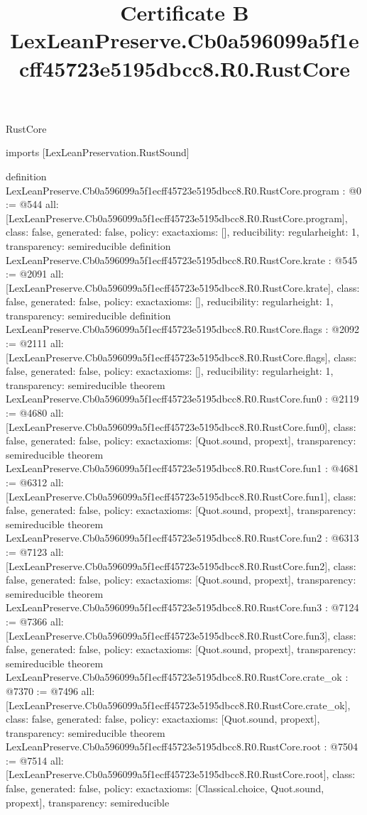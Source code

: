 \begin{lexlean}{RustCore}
\title{Certificate B LexLeanPreserve.Cb0a596099a5f1ecff45723e5195dbcc8.R0.RustCore}
\begin{coremodule}
imports [LexLeanPreservation.RustSound]

definition LexLeanPreserve.Cb0a596099a5f1ecff45723e5195dbcc8.R0.RustCore.program : @0 := @544 {
  all: [LexLeanPreserve.Cb0a596099a5f1ecff45723e5195dbcc8.R0.RustCore.program],
  class: false,
  generated: false,
  policy: exact{axioms: []},
  reducibility: regular{height: 1},
  transparency: semireducible
}
definition LexLeanPreserve.Cb0a596099a5f1ecff45723e5195dbcc8.R0.RustCore.krate : @545 := @2091 {
  all: [LexLeanPreserve.Cb0a596099a5f1ecff45723e5195dbcc8.R0.RustCore.krate],
  class: false,
  generated: false,
  policy: exact{axioms: []},
  reducibility: regular{height: 1},
  transparency: semireducible
}
definition LexLeanPreserve.Cb0a596099a5f1ecff45723e5195dbcc8.R0.RustCore.flags : @2092 := @2111 {
  all: [LexLeanPreserve.Cb0a596099a5f1ecff45723e5195dbcc8.R0.RustCore.flags],
  class: false,
  generated: false,
  policy: exact{axioms: []},
  reducibility: regular{height: 1},
  transparency: semireducible
}
theorem LexLeanPreserve.Cb0a596099a5f1ecff45723e5195dbcc8.R0.RustCore.fun0 : @2119 := @4680 {
  all: [LexLeanPreserve.Cb0a596099a5f1ecff45723e5195dbcc8.R0.RustCore.fun0],
  class: false,
  generated: false,
  policy: exact{axioms: [Quot.sound, propext]},
  transparency: semireducible
}
theorem LexLeanPreserve.Cb0a596099a5f1ecff45723e5195dbcc8.R0.RustCore.fun1 : @4681 := @6312 {
  all: [LexLeanPreserve.Cb0a596099a5f1ecff45723e5195dbcc8.R0.RustCore.fun1],
  class: false,
  generated: false,
  policy: exact{axioms: [Quot.sound, propext]},
  transparency: semireducible
}
theorem LexLeanPreserve.Cb0a596099a5f1ecff45723e5195dbcc8.R0.RustCore.fun2 : @6313 := @7123 {
  all: [LexLeanPreserve.Cb0a596099a5f1ecff45723e5195dbcc8.R0.RustCore.fun2],
  class: false,
  generated: false,
  policy: exact{axioms: [Quot.sound, propext]},
  transparency: semireducible
}
theorem LexLeanPreserve.Cb0a596099a5f1ecff45723e5195dbcc8.R0.RustCore.fun3 : @7124 := @7366 {
  all: [LexLeanPreserve.Cb0a596099a5f1ecff45723e5195dbcc8.R0.RustCore.fun3],
  class: false,
  generated: false,
  policy: exact{axioms: [Quot.sound, propext]},
  transparency: semireducible
}
theorem LexLeanPreserve.Cb0a596099a5f1ecff45723e5195dbcc8.R0.RustCore.crate_ok : @7370 := @7496 {
  all: [LexLeanPreserve.Cb0a596099a5f1ecff45723e5195dbcc8.R0.RustCore.crate_ok],
  class: false,
  generated: false,
  policy: exact{axioms: [Quot.sound, propext]},
  transparency: semireducible
}
theorem LexLeanPreserve.Cb0a596099a5f1ecff45723e5195dbcc8.R0.RustCore.root : @7504 := @7514 {
  all: [LexLeanPreserve.Cb0a596099a5f1ecff45723e5195dbcc8.R0.RustCore.root],
  class: false,
  generated: false,
  policy: exact{axioms: [Classical.choice, Quot.sound, propext]},
  transparency: semireducible
}


\end{coremodule}
\end{lexlean}
